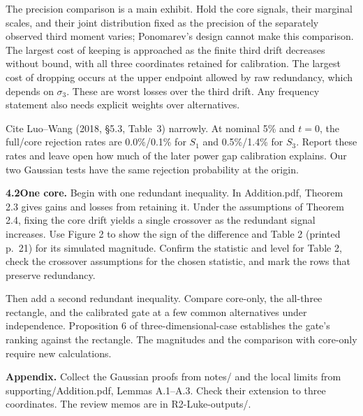 \documentclass[11pt,letterpaper]{article}
\newcommand{\sub}[1]{\par\smallskip\textbf{#1}\enspace}
\newcommand{\file}[1]{\textsf{#1}}
\begin{document}
The precision comparison is a main exhibit. Hold the core signals, their marginal scales, and their joint distribution fixed as the precision of the separately observed third moment varies; Ponomarev's design cannot make this comparison. The largest cost of keeping is approached as the finite third drift decreases without bound, with all three coordinates retained for calibration. The largest cost of dropping occurs at the upper endpoint allowed by raw redundancy, which depends on $\sigma_3$. These are worst losses over the third drift. Any frequency statement also needs explicit weights over alternatives.

Cite Luo--Wang (2018, \S5.3, Table~3) narrowly. At nominal 5\% and $t=0$, the full/core rejection rates are 0.0\%/0.1\% for $S_1$ and 0.5\%/1.4\% for $S_3$. Report these rates and leave open how much of the later power gap calibration explains. Our two Gaussian tests have the same rejection probability at the origin.

\sub{4.2\quad One core.} Begin with one redundant inequality. In \file{Addition.pdf}, Theorem 2.3 gives gains and losses from retaining it. Under the assumptions of Theorem 2.4, fixing the core drift yields a single crossover as the redundant signal increases. Use Figure 2 to show the sign of the difference and Table 2 (printed p.~21) for its simulated magnitude. Confirm the statistic and level for Table 2, check the crossover assumptions for the chosen statistic, and mark the rows that preserve redundancy.

Then add a second redundant inequality. Compare core-only, the all-three rectangle, and the calibrated gate at a few common alternatives under independence. Proposition 6 of \file{three-dimensional-case} establishes the gate's ranking against the rectangle. The magnitudes and the comparison with core-only require new calculations.

\sub{Appendix.} Collect the Gaussian proofs from \file{notes/} and the local limits from \file{supporting/Addition.pdf}, Lemmas A.1--A.3. Check their extension to three coordinates. The review memos are in \file{R2-Luke-outputs/}.
\end{document}
